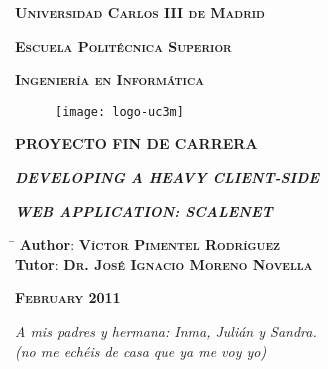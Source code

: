 \begin{titlepage}

  \addtolength{\oddsidemargin}{0.45cm}

  \centerline{\large{\textbf{\textsc{Universidad Carlos III de Madrid}}}}
  \vspace{0.8cm}

  \centerline{\large{\textbf{\textsc{Escuela Politécnica Superior}}}}
  \vspace{0.8cm}

  \centerline{\large{\textbf{\textsc{Ingeniería en Informática}}}}

  \begin{figure}[!htbp]
    \centering\texttt{[image: logo-uc3m]}
  \end{figure}

  \centerline{\Large{\textbf{\uppercase{PROYECTO FIN DE CARRERA}}}}
  \vspace{2cm}

  \centerline{\textbf{\textit{\huge{D}\LARGE{EVELOPING A }\huge{H}\LARGE{EAVY}
    \huge{C}\LARGE{LIENT-}\huge{S}\LARGE{IDE}}}}
  \vspace{0.4cm}

  \centerline{\textbf{\textit{\huge{W}\LARGE{EB }\huge{A}\LARGE{PPLICATION:}
    \huge{S}\LARGE{CALE}\huge{N}\LARGE{ET}}}}
  \vspace{3.5cm}

  \begin{flushright}
      \begin{tabbing}\hspace{2.5cm} \= \kill
        {\large{\textbf{Author}:}} \> {\large{\textbf{\textsc{Víctor Pimentel
        Rodríguez}}}}\\
        {\large{\textbf{Tutor}:}} \> {\large{\textbf{\textsc{Dr. José Ignacio
        Moreno Novella}}}}\\
      \end{tabbing}
  \end{flushright}

  \begin{flushright}
    {\large{\textbf{\textsc{February 2011}}}}
  \end{flushright}

\end{titlepage}

\newpage
\thispagestyle{empty} \cleardoublepage

\begin{flushright}
  \null{}
    {\textit{A mis padres y hermana: Inma, Julián y Sandra.}}\\
    {\textit{(no me echéis de casa que ya me voy yo)}}
  \null
\end{flushright}

\thispagestyle{empty}
